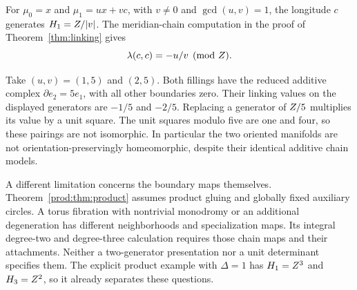 For $\mu_0=x$ and $\mu_1=ux+vc$, with $v\ne0$ and
$\gcd(u,v)=1$, the longitude $c$ generates $H_1=Z/|v|$.
The meridian-chain computation in the proof of
Theorem~\ref{thm:linking} gives
\begin{equation}\label{prod:eq:linking-distinction}
                            \lambda(c,c)=-u/v\pmod{Z}.
\end{equation}

Take $(u,v)=(1,5)$ and $(2,5)$.
Both fillings have the reduced additive complex
$\partial e_2=5e_1$, with all other boundaries zero.
Their linking values on the displayed generators are $-1/5$ and
$-2/5$.  Replacing a generator of $Z/5$ multiplies its value by
a unit square.  The unit squares modulo five are one and four, so these
pairings are not isomorphic.  In particular the two oriented manifolds
are not orientation-preservingly homeomorphic, despite their identical
additive chain models.

A different limitation concerns the boundary maps themselves.
Theorem~\ref{prod:thm:product} assumes product gluing and globally fixed
auxiliary circles.  A torus fibration with nontrivial monodromy or an
additional degeneration has different neighborhoods and specialization
maps.  Its integral degree-two and degree-three calculation requires
those chain maps and their attachments.  Neither a two-generator
presentation nor a unit determinant specifies them.
The explicit product example with $\Delta=1$ has
$H_1=Z^3$ and $H_3=Z^2$, so it already separates these questions.
